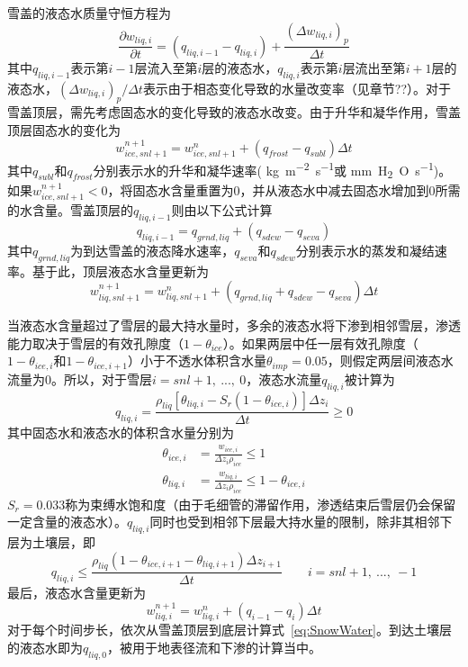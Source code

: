 雪盖的液态水质量守恒方程为
\begin{equation}
    \frac{\partial w_{liq,i}}{\partial t}=\left(q_{liq,i-1}-q_{liq,i}\right)+\frac{{\left(\Delta w_{liq,i}\right)}_p}{\Delta t}
\end{equation}
其中$q_{liq,i-1}$表示第$i-1$层流入至第$i$层的液态水，$q_{liq,i}$表示第$i$层流出至第$i+1$层的液态水，${{\left(\Delta w_{liq,i}\right)}_p}/{\Delta t}$表示由于相态变化导致的水量改变率（见章节??）。对于雪盖顶层，需先考虑固态水的变化导致的液态水改变。由于升华和凝华作用，雪盖顶层固态水的变化为
\begin{equation}
    w_{ice,snl+1}^{n+1}=w_{ice,snl+1}^n+\left(q_{frost}-q_{subl}\right)\Delta t
\end{equation}
其中$q_{subl}$和$q_{frost}$分别表示水的升华和凝华速率( \unit{kg.m^{-2}.s^{-1}}或 \unit{mm.H_2O.s^{-1}})。如果$w_{ice,snl+1}^{n+1}<0$，将固态水含量重置为0，并从液态水中减去固态水增加到0所需的水含量。雪盖顶层的$q_{liq,i-1}$则由以下公式计算
\begin{equation}
    q_{liq,i-1}=q_{grnd,liq}+\left(q_{sdew}-q_{seva}\right)
\end{equation}
其中$q_{grnd,liq}$为到达雪盖的液态降水速率，$q_{seva}$和$q_{sdew}$分别表示水的蒸发和凝结速率。基于此，顶层液态水含量更新为
\begin{equation}
    w_{liq,snl+1}^{n+1}=w_{liq,snl+1}^n+\left(q_{grnd,liq}+q_{sdew}-q_{seva}\right)\Delta t
\end{equation}

当液态水含量超过了雪层的最大持水量时，多余的液态水将下渗到相邻雪层，渗透能力取决于雪层的有效孔隙度（$1-\theta_{ice}$）。如果两层中任一层有效孔隙度（$1-\theta_{ice,i}$和$1-\theta_{ice,i+1}$）小于不透水体积含水量$\theta_{imp}=0.05$，则假定两层间液态水流量为0。所以，对于雪层$i=snl+1,\ ...,\ 0$，液态水流量$q_{liq,i}$被计算为
\begin{equation}
    q_{liq,i}=\frac{\rho_{liq}\left[\theta_{liq,i}-S_r\left(1-\theta_{ice,i}\right)\right]\Delta z_i}{\Delta t}\geqslant 0
\end{equation}
其中固态水和液态水的体积含水量分别为
\begin{align}
    \theta_{ice,i}&=\frac{w_{ice,i}}{\Delta z_i \rho_{ice}} \leqslant 1 \\
    \theta_{liq,i}&=\frac{w_{liq,i}}{\Delta z_i \rho_{ice}} \leqslant 1-\theta_{ice,i}
\end{align}
$S_r=0.033$称为束缚水饱和度（由于毛细管的滞留作用，渗透结束后雪层仍会保留一定含量的液态水）。$q_{liq,i}$同时也受到相邻下层最大持水量的限制，除非其相邻下层为土壤层，即
\begin{equation}
    q_{liq,i} \leqslant \frac{\rho_{liq}\left(1-\theta_{ice,i+1}-\theta_{liq,i+1}\right)\Delta z_{i+1}}{\Delta t} \qquad i=snl+1,\ ...,\ -1
\end{equation}
最后，液态水含量更新为
\begin{equation}\label{eq:SnowWater}
    w_{liq,i}^{n+1}=w_{liq,i}^n+\left(q_{i-1}-q_i\right)\Delta t
\end{equation}
对于每个时间步长，依次从雪盖顶层到底层计算式~\eqref{eq:SnowWater}。到达土壤层的液态水即为$q_{liq,0}$，被用于地表径流和下渗的计算当中。

